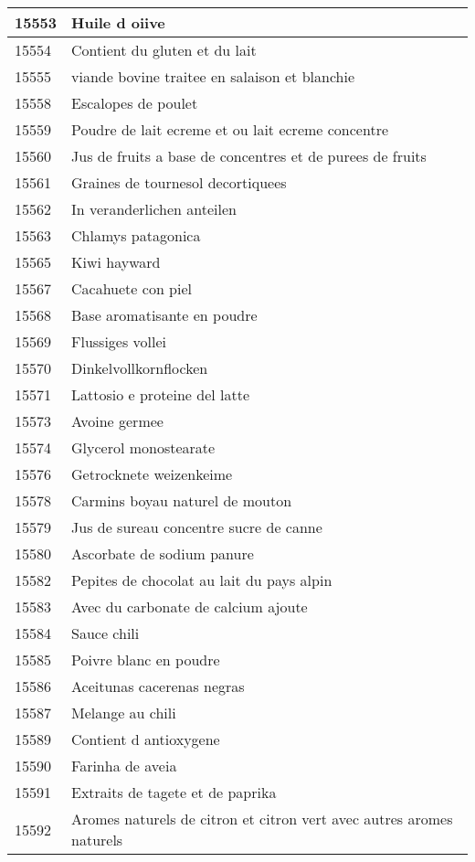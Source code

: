 \begin{longtable}{|l|l|}
15553 & Huile d oiive \\ \hline 
15554 & Contient du gluten et du lait \\ \hline 
15555 & viande bovine traitee en salaison et blanchie \\ \hline 
15558 & Escalopes de poulet \\ \hline 
15559 & Poudre de lait ecreme et ou lait ecreme concentre \\ \hline 
15560 & Jus de fruits a base de concentres et de purees de fruits \\ \hline 
15561 & Graines de tournesol decortiquees \\ \hline 
15562 & In veranderlichen anteilen \\ \hline 
15563 & Chlamys patagonica \\ \hline 
15565 & Kiwi hayward \\ \hline 
15567 & Cacahuete con piel \\ \hline 
15568 & Base aromatisante en poudre \\ \hline 
15569 & Flussiges vollei \\ \hline 
15570 & Dinkelvollkornflocken \\ \hline 
15571 & Lattosio e proteine del latte \\ \hline 
15573 & Avoine germee \\ \hline 
15574 & Glycerol monostearate \\ \hline 
15576 & Getrocknete weizenkeime \\ \hline 
15578 & Carmins boyau naturel de mouton \\ \hline 
15579 & Jus de sureau concentre sucre de canne \\ \hline 
15580 & Ascorbate de sodium panure \\ \hline 
15582 & Pepites de chocolat au lait du pays alpin \\ \hline 
15583 & Avec du carbonate de calcium ajoute \\ \hline 
15584 & Sauce chili \\ \hline 
15585 & Poivre blanc en poudre \\ \hline 
15586 & Aceitunas cacerenas negras \\ \hline 
15587 & Melange au chili \\ \hline 
15589 & Contient d antioxygene \\ \hline 
15590 & Farinha de aveia \\ \hline 
15591 & Extraits de tagete et de paprika \\ \hline 
15592 & Aromes naturels de citron et citron vert avec autres aromes naturels \\ \hline 

\end{longtable}
